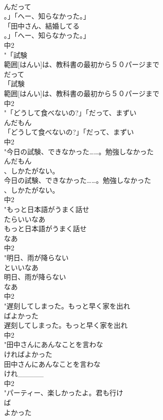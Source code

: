 \documentclass[8pt]{extreport}
\begin{document}
\begin{CJK}{UTF8}{min}
\\	んだって
\\	。」「へー、知らなかった。」
\\	「田中さん、結婚してる
\\	。」「へー、知らなかった。」
\\	中2
\\	"「試験
\\	範囲[はんい]は、教科書の最初から５０パージまで
\\	だって
\\	「試験
\\	範囲[はんい]は、教科書の最初から５０パージまで
\\	中2
\\	"「どうして食べないの?」「だって、まずい
\\	んだもん
\\	「どうして食べないの?」「だって、まずい
\\	中2
\\	"今日の試験、できなかった……。勉強しなかった
\\	んだもん
\\	、しかたがない。
\\	今日の試験、できなかった……。勉強しなかった
\\	、しかたがない。
\\	中2
\\	"もっと日本語がうまく話せ
\\	たらいいなあ
\\	もっと日本語がうまく話せ
\\	なあ
\\	中2
\\	"明日、雨が降らない
\\	といいなあ
\\	明日、雨が降らない
\\	なあ
\\	中2
\\	"遅刻してしまった。もっと早く家を出れ
\\	ばよかった
\\	遅刻してしまった。もっと早く家を出れ
\\	中2
\\	"田中さんにあんなことを言わな
\\	ければよかった
\\	田中さんにあんなことを言わな
\\	けれ_____
\\	中2
\\	"パーティー、楽しかったよ。君も行け
\\	ば
\\	よかった

\end{CJK}
\end{document}
